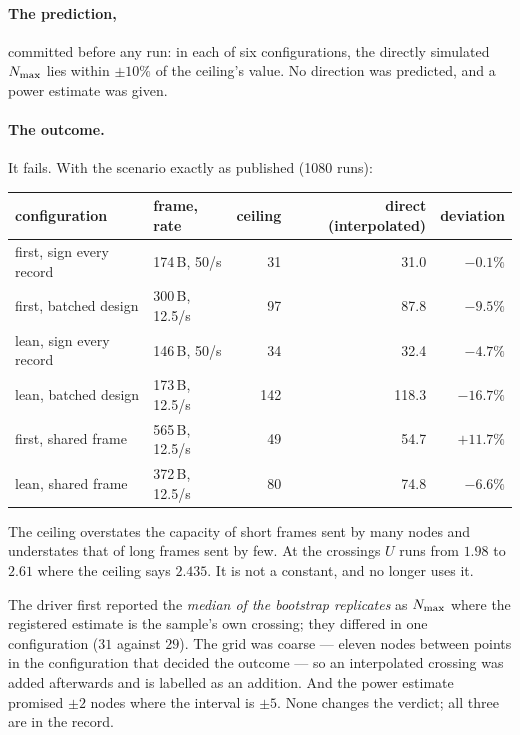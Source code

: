 \paragraph{The prediction,} committed before any run: in each of six configurations, the directly
simulated $N_{\max}$ lies within $\pm 10\%$ of the ceiling's value. No direction was predicted, and a
power estimate was given.

\paragraph{The outcome.} It fails. With the scenario exactly as published (1080 runs):

\begin{center}
\begin{tabular}{llrrr}
\toprule
configuration & frame, rate & ceiling & direct (interpolated) & deviation \\
\midrule
first, sign every record & 174\,B, 50/s & 31 & 31.0 & $-0.1\%$ \\
first, batched design & 300\,B, 12.5/s & 97 & 87.8 & $-9.5\%$ \\
lean, sign every record & 146\,B, 50/s & 34 & 32.4 & $-4.7\%$ \\
lean, batched design & 173\,B, 12.5/s & 142 & 118.3 & $\mathbf{-16.7\%}$ \\
first, shared frame & 565\,B, 12.5/s & 49 & 54.7 & $+11.7\%$ \\
lean, shared frame & 372\,B, 12.5/s & 80 & 74.8 & $-6.6\%$ \\
\bottomrule
\end{tabular}
\end{center}

The ceiling overstates the capacity of short frames sent by many nodes and understates that of
long frames sent by few. At the crossings $U$ runs from $1.98$ to $2.61$ where the ceiling says
$2.435$. It is not a constant, and  no longer uses it.

\begin{remark}
The driver first reported the \emph{median of the bootstrap replicates} as $N_{\max}$ where the
registered estimate is the sample's own crossing; they differed in one configuration ($31$ against
$29$). The grid was coarse --- eleven nodes between points in the configuration that decided the
outcome --- so an interpolated crossing was added afterwards and is labelled as an addition. And
the power estimate promised $\pm 2$ nodes where the interval is $\pm 5$. None changes the verdict;
all three are in the record.
\end{remark}

